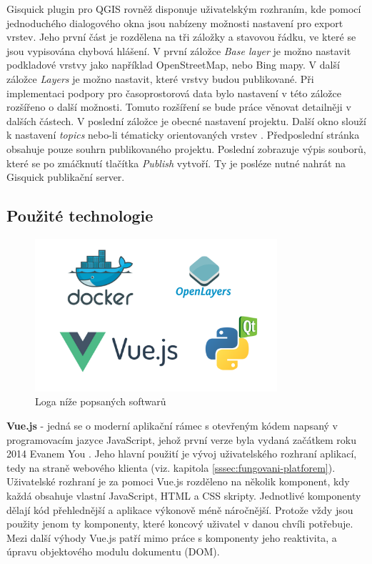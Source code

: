 \newpage
Gisquick plugin pro QGIS rovněž disponuje uživatelským rozhraním, kde
pomocí jednoduchého dialogového okna jsou nabízeny možnosti nastavení
pro export vrstev. Jeho první část je rozdělena na tři záložky a
stavovou řádku, ve které se jsou vypisována chybová hlášení. V
první záložce \textit{Base layer} je možno nastavit podkladové vrstvy
jako například OpenStreetMap, nebo Bing mapy. V další záložce
\textit{Layers} je možno nastavit, které vrstvy budou publikované. Při
implementaci podpory pro časoprostorová data bylo nastavení v této
záložce rozšířeno o další možnosti. Tomuto rozšíření se bude
práce věnovat detailněji v dalších částech. V poslední záložce je
obecné nastavení projektu. Další okno slouží k nastavení \textit{topics}
nebo-li tématicky orientovaných vrstev \cite{gisquick-manual}. Předposlední
stránka obsahuje pouze souhrn publikovaného projektu. Poslední zobrazuje
výpis souborů, které se po zmáčknutí tlačítka \textit{Publish}
vytvoří. Ty je posléze nutné nahrát na Gisquick publikační server.

\newpage
\subsection{Použité technologie}

\begin{figure}[h!]
\centering
\includegraphics[width=0.8\textwidth]{../img/technologies.png}
\caption{Loga níže popsaných softwarů}
\label{fig:technoogies}
\end{figure}

\noindent
\textbf{Vue.js} - jedná se o moderní aplikační rámec s otevřeným kódem
napsaný v programovacím jazyce JavaScript, jehož první verze byla vydaná
začátkem roku 2014 Evanem You \cite{vue-history}. Jeho hlavní použití je
vývoj uživatelského rozhraní aplikací, tedy na straně webového klienta
(viz. kapitola \ref{sssec:fungovani-platforem}). Uživatelské rozhraní
je za pomoci Vue.js rozděleno na několik  komponent, kdy každá obsahuje
vlastní JavaScript, HTML a CSS skripty. Jednotlivé komponenty dělají kód
přehlednější a aplikace výkonově méně náročnější. Protože vždy
jsou použity jenom ty komponenty, které koncový uživatel v danou chvíli
potřebuje. Mezi další výhody Vue.js patří mimo práce s komponenty
jeho reaktivita, a úpravu objektového modulu dokumentu (DOM).

